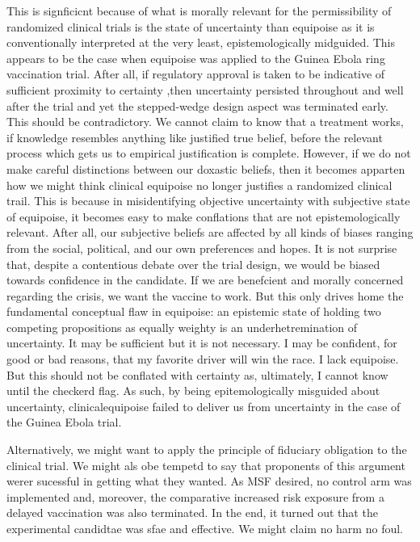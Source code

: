 \documentclass[letterpaper,notitlepage,12pt]{article}
\begin{document}
This is signficicnt because of what is morally relevant for the permissibility
of randomized clinical trials is the state of uncertainty than equipoise as it
is conventionally interpreted at the very least, epistemologically midguided.
This appears to be the case when equipoise was applied to the Guinea Ebola ring
vaccination trial.
After all, if regulatory approval is taken to be indicative of sufficient
proximity to certainty ,then uncertainty persisted throughout and well after the
trial and yet the stepped-wedge design aspect was terminated early.
This should be contradictory.
We cannot claim to know that a treatment works, if knowledge resembles anything
like justified true belief, before the relevant process which gets us to
empirical justification is complete.
However, if we do not make careful distinctions between our doxastic beliefs,
then it becomes apparten how we might think clinical equipoise no longer
justifies a randomized clinical trail.
This is because in misidentifying objective uncertainty with subjective state of
equipoise, it becomes easy to make conflations that are not epistemologically
relevant.
After all, our subjective beliefs are affected by all kinds of biases ranging
from the social, political, and our own preferences and hopes.
It is not surprise that, despite a contentious debate over the trial design, we
would be biased towards confidence in the candidate.
If we are benefcient and morally concerned regarding the crisis, we want the
vaccine to work.
But this only drives home the fundamental conceptual flaw in equipoise: an
epistemic state of holding two competing propositions as equally weighty is an
underhetremination of uncertainty.
It may be sufficient but it is not necessary.
I may be confident, for good or bad reasons, that my favorite driver will win
the race.
I lack equipoise.
But this should not be conflated with certainty as, ultimately, I cannot know
until the checkerd flag.
As such, by being epitemologically misguided about uncertainty,
clinicalequipoise failed to deliver us from uncertainty in the case of the
Guinea Ebola trial.

Alternatively, we might want to apply the principle of fiduciary obligation to
the clinical trial.
We might als obe tempetd to say that proponents of this argument werer sucessful
in getting what they wanted.
As MSF desired, no control arm was implemented and, moreover, the comparative
increased risk exposure from a delayed vaccination was also terminated.
In the end, it turned out that the experimental candidtae was sfae and
effective.
We might claim no harm no foul.
\end{document}

